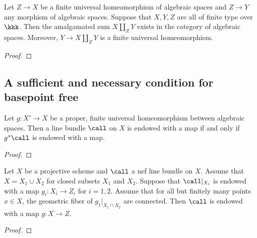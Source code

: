    \begin{corollary}\label{lem:amalgamated_sum_exist_for_finite_universal_homeomorphism_in_char_p}
        Let \(Z \to X\) be a finite universal homeomorphism of algebraic spaces and \(Z \to Y\) any morphism of algebraic spaces.
        Suppose that \(X,Y,Z\) are all of finite type over \(\kkk\).
        Then the amalgamated sum \(X \amalg_Z Y\) exists in the category of algebraic spaces.
        Moreover, \(Y \to X \amalg_Z Y\) is a finite universal homeomorphism.
    \end{corollary}
    \begin{proof}
    \end{proof}

\subsection{A sufficient and necessary condition for basepoint free}

    \begin{proposition}\label{prop:bpf_for_non-reduced}
        Let \(g: X' \to X\) be a proper, finite universal homeomorphism between algebraic spaces.
        Then a line bundle \(\call\) on \(X\) is endowed with a map if and only if \(g^*\call\) is endowed with a map.
    \end{proposition}
    \begin{proof}
    \end{proof}

    \begin{proposition}\label{prop:bpf_for_reducible}
        Let \(X\) be a projective scheme and \(\call\) a nef line bundle on \(X\).
        Assume that \(X = X_1 \cup X_2\) for closed subsets \(X_1\) and \(X_2\).
        Suppose that \(\call|_{X_i}\) is endowed with a map \(g_i:X_i \to Z_i\) for \(i = 1,2\).
        Assume that for all but finitely many points \(x \in X\), the geometric fiber of \(g_1|_{X_1\cap X_2}\) are connected.
        Then \(\call\) is endowed with a map \(g: X \to Z\).
    \end{proposition}
    \begin{proof}
    \end{proof}

